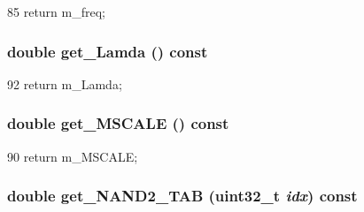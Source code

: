 \begin{DoxyCode}
85 { return m_freq; }
\end{DoxyCode}
\hypertarget{classTechParameter_a7240a705667eb6231fc3e84491d41484}{
\subsubsection[{get\_\-Lamda}]{\setlength{\rightskip}{0pt plus 5cm}double get\_\-Lamda () const}}
\label{classTechParameter_a7240a705667eb6231fc3e84491d41484}



\begin{DoxyCode}
92 { return m_Lamda; }
\end{DoxyCode}
\hypertarget{classTechParameter_add77aef179c4c04d4ead2b9f955792ff}{
\subsubsection[{get\_\-MSCALE}]{\setlength{\rightskip}{0pt plus 5cm}double get\_\-MSCALE () const}}
\label{classTechParameter_add77aef179c4c04d4ead2b9f955792ff}



\begin{DoxyCode}
90 { return m_MSCALE; }
\end{DoxyCode}
\hypertarget{classTechParameter_ad62c0a5630b13d0a9c4cbfe5bb9404d5}{
\subsubsection[{get\_\-NAND2\_\-TAB}]{\setlength{\rightskip}{0pt plus 5cm}double get\_\-NAND2\_\-TAB ({\bf uint32\_\-t} {\em idx}) const}}
\label{classTechParameter_ad62c0a5630b13d0a9c4cbfe5bb9404d5}



